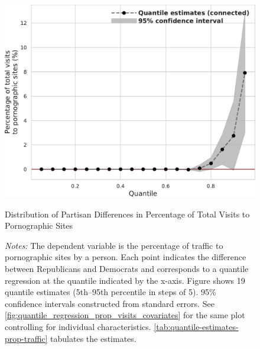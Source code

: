 \documentclass[12pt,twoside]{article}
\begin{document}
\begin{figure}
	\centering
	\includegraphics[width=.6\linewidth]{figs/quantile_reg_proportion_visits_adult.pdf}
	\caption{Distribution of Partisan Differences in Percentage of Total Visits to Pornographic Sites}
	\caption*{\footnotesize \emph{Notes:} 
		The dependent variable is the percentage of traffic to pornographic sites by a person.
		Each point indicates the difference between Republicans and Democrats and corresponds to a quantile regression at the quantile indicated by the x-axis.
  Figure shows 19 quantile estimates (5th--95th percentile in steps of 5).
		95\% confidence intervals constructed from standard errors.
		See \cref{fig:quantile_regression_prop_visits_covariates} for the same plot controlling for individual characteristics.
            \cref{tab:quantile-estimates-prop-traffic} tabulates the estimates.
	}
	\label{fig:quantile_regression_prop_visits}
\end{figure}
\end{document}
